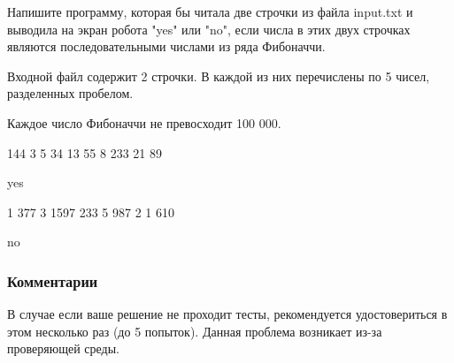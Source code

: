 
Напишите программу, которая бы читала две строчки из файла input.txt и выводила на экран робота "yes" или "no", если числа в этих двух строчках являются последовательными числами из ряда Фибоначчи.

 
Входной файл содержит 2 строчки. В каждой из них перечислены по 5 чисел, разделенных пробелом.

Каждое число Фибоначчи не превосходит 100 000.

\begin{myverbbox}[\small]{\vinput} 
    144 3 5 34 13
    55 8 233 21 89
\end{myverbbox}
\begin{myverbbox}[\small]{\voutput}
    yes
\end{myverbbox}

\begin{myverbbox}[\small]{\vinput} 
    1 377 3 1597 233 
    5 987 2 1 610
\end{myverbbox}
\begin{myverbbox}[\small]{\voutput}
    no
\end{myverbbox}

\subsubsection*{Комментарии}

В случае если ваше решение не проходит тесты, рекомендуется удостовериться в этом несколько раз (до 5 попыток). Данная проблема возникает из-за проверяющей среды.

